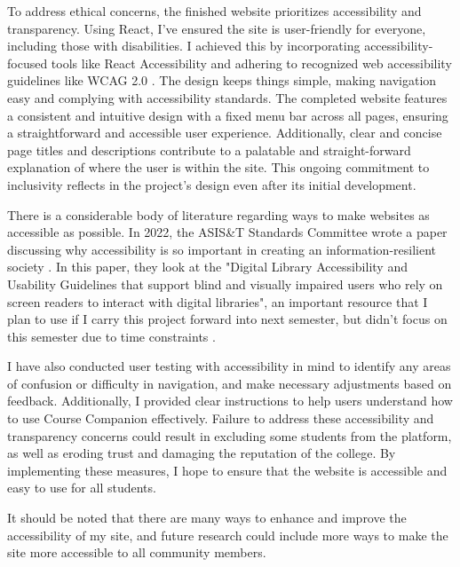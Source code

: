 \documentclass[10pt,twocolumn]{article}
\begin{document}
To address ethical concerns, the finished website prioritizes accessibility and transparency. Using React, I've ensured the site is user-friendly for everyone, including those with disabilities. I achieved this by incorporating accessibility-focused tools like React Accessibility and adhering to recognized web accessibility guidelines like WCAG 2.0 \cite{noname08}. The design keeps things simple, making navigation easy and complying with accessibility standards. The completed website features a consistent and intuitive design with a fixed menu bar across all pages, ensuring a straightforward and accessible user experience. Additionally, clear and concise page titles and descriptions contribute to a palatable and straight-forward explanation of where the user is within the site. This ongoing commitment to inclusivity reflects in the project's design even after its initial development. 

There is a considerable body of literature regarding ways to make websites as accessible as possible. In 2022, the ASIS\&T Standards Committee wrote a paper discussing why accessibility is so important in creating an information-resilient society \cite{dickey2022accessibility}. In this paper, they look at the "Digital Library Accessibility and Usability Guidelines that support blind and visually impaired users who rely on screen readers to interact with digital libraries", an important resource that I plan to use if I carry this project forward into next semester, but didn't focus on this semester due to time constraints \cite{dickey2022accessibility}.


I have also conducted user testing with accessibility in mind to identify any areas of confusion or difficulty in navigation, and make necessary adjustments based on feedback. Additionally, I provided clear instructions to help users understand how to use Course Companion effectively. Failure to address these accessibility and transparency concerns could result in excluding some students from the platform, as well as eroding trust and damaging the reputation of the college. By implementing these measures, I hope to ensure that the website is accessible and easy to use for all students.

It should be noted that there are many ways to enhance and improve the accessibility of my site, and future research could include more ways to make the site more accessible to all community members.
\end{document}
